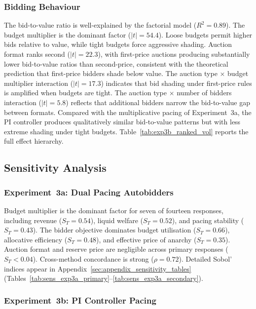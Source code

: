 \subsubsection{Bidding Behaviour}

The bid-to-value ratio is well-explained by the factorial model ($R^2 = 0.89$). The budget multiplier is the dominant factor ($|t| = 54.4$). Loose budgets permit higher bids relative to value, while tight budgets force aggressive shading. Auction format ranks second ($|t| = 22.3$), with first-price auctions producing substantially lower bid-to-value ratios than second-price, consistent with the theoretical prediction that first-price bidders shade below value. The auction type $\times$ budget multiplier interaction ($|t| = 17.3$) indicates that bid shading under first-price rules is amplified when budgets are tight. The auction type $\times$ number of bidders interaction ($|t| = 5.8$) reflects that additional bidders narrow the bid-to-value gap between formats. Compared with the multiplicative pacing of Experiment~3a, the PI controller produces qualitatively similar bid-to-value patterns but with less extreme shading under tight budgets. Table~\ref{tab:exp3b_ranked_vol} reports the full effect hierarchy.



\subsection{Sensitivity Analysis}
\label{sec:sens_pacing}

\subsubsection{Experiment~3a: Dual Pacing Autobidders}
\label{sec:sens_exp3a}

Budget multiplier is the dominant factor for seven of fourteen responses, including revenue ($S_T = 0.54$), liquid welfare ($S_T = 0.52$), and pacing stability ($S_T = 0.43$). The bidder objective dominates budget utilisation ($S_T = 0.66$), allocative efficiency ($S_T = 0.48$), and effective price of anarchy ($S_T = 0.35$). Auction format and reserve price are negligible across primary responses ($S_T < 0.04$). Cross-method concordance is strong ($\rho = 0.72$). Detailed Sobol' indices appear in Appendix~\ref{sec:appendix_sensitivity_tables} (Tables~\ref{tab:sens_exp3a_primary}--\ref{tab:sens_exp3a_secondary}).

\subsubsection{Experiment~3b: PI Controller Pacing}
\label{sec:sens_exp3b}

